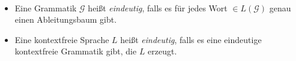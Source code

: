 %   

\begin{Def}[name={[Eindeutigkeit von \acs*{CFG} und \acs*{CFL}]}]\
	\begin{itemize}
  \item Eine Grammatik $\mathcal{G}$ heißt \emph{eindeutig}, falls es für jedes Wort $\in L(\mathcal{G})$ genau einen Ableitungsbaum gibt.
	\item Eine kontextfreie Sprache $L$ heißt \emph{eindeutig}, falls es eine eindeutige kontextfreie Grammatik gibt, die $L$ erzeugt.
	\qedhere
	\end{itemize}
\end{Def}


